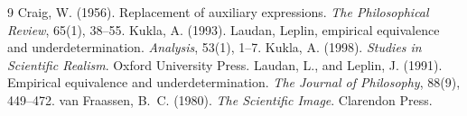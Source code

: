 \documentclass{situationist-preprint}
\begin{document}
\begin{thebibliography}{9}
 Craig, W. (1956). Replacement of auxiliary expressions. \emph{The Philosophical Review}, 65(1), 38--55.
 Kukla, A. (1993). Laudan, Leplin, empirical equivalence and underdetermination. \emph{Analysis}, 53(1), 1--7.
 Kukla, A. (1998). \emph{Studies in Scientific Realism}. Oxford University Press.
 Laudan, L., and Leplin, J. (1991). Empirical equivalence and underdetermination. \emph{The Journal of Philosophy}, 88(9), 449--472.
 van Fraassen, B.~C. (1980). \emph{The Scientific Image}. Clarendon Press.
\end{thebibliography}
\end{document}
